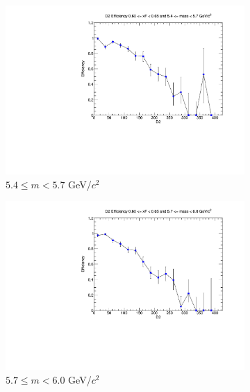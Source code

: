 \documentclass[11pt]{article}
\begin{document}
\begin{figure}[p]
\begin{subfigure}[b]{0.32\textwidth}
        \includegraphics[width=\textwidth]{./kTrackerEfficiencyPlots/D2_Efficiency_xF12_mass4.pdf}
        \caption{$5.4 \leq m < 5.7$ GeV/$c^2$}
    \end{subfigure}\hfill
    \begin{subfigure}[b]{0.32\textwidth}
        \centering
        \includegraphics[width=\textwidth]{./kTrackerEfficiencyPlots/D2_Efficiency_xF12_mass5.pdf}
        \caption{$5.7 \leq m < 6.0$ GeV/$c^2$}
    \end{subfigure}\vspace{0.5cm}
    \begin{subfigure}[b]{0.32\textwidth}
        \centering

\end{subfigure}
\end{figure}
\end{document}
